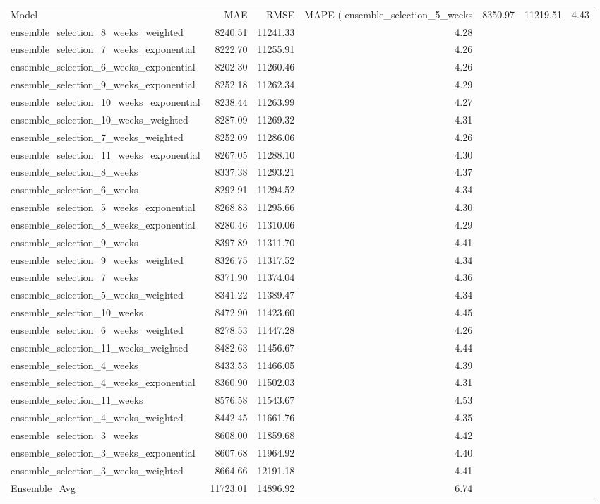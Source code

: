 \begin{tabular}{lrrr}
\toprule
Model & MAE & RMSE & MAPE (%
\midrule
ensemble_selection_5_weeks & 8350.97 & 11219.51 & 4.43 \\
ensemble_selection_8_weeks_weighted & 8240.51 & 11241.33 & 4.28 \\
ensemble_selection_7_weeks_exponential & 8222.70 & 11255.91 & 4.26 \\
ensemble_selection_6_weeks_exponential & 8202.30 & 11260.46 & 4.26 \\
ensemble_selection_9_weeks_exponential & 8252.18 & 11262.34 & 4.29 \\
ensemble_selection_10_weeks_exponential & 8238.44 & 11263.99 & 4.27 \\
ensemble_selection_10_weeks_weighted & 8287.09 & 11269.32 & 4.31 \\
ensemble_selection_7_weeks_weighted & 8252.09 & 11286.06 & 4.26 \\
ensemble_selection_11_weeks_exponential & 8267.05 & 11288.10 & 4.30 \\
ensemble_selection_8_weeks & 8337.38 & 11293.21 & 4.37 \\
ensemble_selection_6_weeks & 8292.91 & 11294.52 & 4.34 \\
ensemble_selection_5_weeks_exponential & 8268.83 & 11295.66 & 4.30 \\
ensemble_selection_8_weeks_exponential & 8280.46 & 11310.06 & 4.29 \\
ensemble_selection_9_weeks & 8397.89 & 11311.70 & 4.41 \\
ensemble_selection_9_weeks_weighted & 8326.75 & 11317.52 & 4.34 \\
ensemble_selection_7_weeks & 8371.90 & 11374.04 & 4.36 \\
ensemble_selection_5_weeks_weighted & 8341.22 & 11389.47 & 4.34 \\
ensemble_selection_10_weeks & 8472.90 & 11423.60 & 4.45 \\
ensemble_selection_6_weeks_weighted & 8278.53 & 11447.28 & 4.26 \\
ensemble_selection_11_weeks_weighted & 8482.63 & 11456.67 & 4.44 \\
ensemble_selection_4_weeks & 8433.53 & 11466.05 & 4.39 \\
ensemble_selection_4_weeks_exponential & 8360.90 & 11502.03 & 4.31 \\
ensemble_selection_11_weeks & 8576.58 & 11543.67 & 4.53 \\
ensemble_selection_4_weeks_weighted & 8442.45 & 11661.76 & 4.35 \\
ensemble_selection_3_weeks & 8608.00 & 11859.68 & 4.42 \\
ensemble_selection_3_weeks_exponential & 8607.68 & 11964.92 & 4.40 \\
ensemble_selection_3_weeks_weighted & 8664.66 & 12191.18 & 4.41 \\
Ensemble_Avg & 11723.01 & 14896.92 & 6.74 \\
\bottomrule
\end{tabular}
